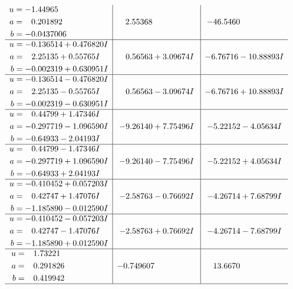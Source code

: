 \documentclass[1p]{elsarticle_modified}
\theoremstyle{definition}
\begin{document}
$$\begin{array}{c|c|c}
\begin{aligned}
u &= -1.44965\phantom{ +0.000000I} \\
a &= \phantom{-}0.201892\phantom{ +0.000000I} \\
b &= -0.0437006\phantom{ +0.000000I}\end{aligned}
 & \phantom{-}2.55368\phantom{ +0.000000I} & -46.5460\phantom{ +0.000000I} \\ \hline\begin{aligned}
u &= -0.136514 + 0.476820 I \\
a &= \phantom{-}2.25135 + 0.55765 I \\
b &= -0.002319 + 0.630951 I\end{aligned}
 & \phantom{-}0.56563 + 3.09674 I & -6.76716 - 10.88893 I \\ \hline\begin{aligned}
u &= -0.136514 - 0.476820 I \\
a &= \phantom{-}2.25135 - 0.55765 I \\
b &= -0.002319 - 0.630951 I\end{aligned}
 & \phantom{-}0.56563 - 3.09674 I & -6.76716 + 10.88893 I \\ \hline\begin{aligned}
u &= \phantom{-}0.44799 + 1.47346 I \\
a &= -0.297719 - 1.096590 I \\
b &= -0.64933 - 2.04193 I\end{aligned}
 & -9.26140 + 7.75496 I & -5.22152 - 4.05634 I \\ \hline\begin{aligned}
u &= \phantom{-}0.44799 - 1.47346 I \\
a &= -0.297719 + 1.096590 I \\
b &= -0.64933 + 2.04193 I\end{aligned}
 & -9.26140 - 7.75496 I & -5.22152 + 4.05634 I \\ \hline\begin{aligned}
u &= -0.410452 + 0.057203 I \\
a &= \phantom{-}0.42747 + 1.47076 I \\
b &= -1.185890 - 0.012590 I\end{aligned}
 & -2.58763 - 0.76692 I & -4.26714 + 7.68799 I \\ \hline\begin{aligned}
u &= -0.410452 - 0.057203 I \\
a &= \phantom{-}0.42747 - 1.47076 I \\
b &= -1.185890 + 0.012590 I\end{aligned}
 & -2.58763 + 0.76692 I & -4.26714 - 7.68799 I \\ \hline\begin{aligned}
u &= \phantom{-}1.73221\phantom{ +0.000000I} \\
a &= \phantom{-}0.291826\phantom{ +0.000000I} \\
b &= \phantom{-}0.419942\phantom{ +0.000000I}\end{aligned}
 & -0.749607\phantom{ +0.000000I} & \phantom{-}13.6670\phantom{ +0.000000I}\\
 \hline 
 \end{array}$$\newpage
\end{document}
